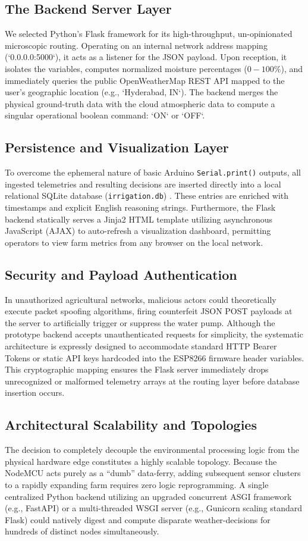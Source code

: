 \documentclass[conference]{IEEEtran}
\begin{document}
\subsection{The Backend Server Layer}
We selected Python's Flask framework for its high-throughput, un-opinionated microscopic routing. Operating on an internal network address mapping (`0.0.0.0:5000`), it acts as a listener for the JSON payload. Upon reception, it isolates the variables, computes normalized moisture percentages ($0-100\%$), and immediately queries the public OpenWeatherMap REST API \cite{b9} mapped to the user's geographic location (e.g., `Hyderabad, IN`). The backend merges the physical ground-truth data with the cloud atmospheric data to compute a singular operational boolean command: `ON` or `OFF`. 

\subsection{Persistence and Visualization Layer}
To overcome the ephemeral nature of basic Arduino \texttt{Serial.print()} outputs, all ingested telemetries and resulting decisions are inserted directly into a local relational SQLite database (\texttt{irrigation.db}) \cite{b10}. These entries are enriched with timestamps and explicit English reasoning strings. Furthermore, the Flask backend statically serves a Jinja2 HTML template utilizing asynchronous JavaScript (AJAX) to auto-refresh a visualization dashboard, permitting operators to view farm metrics from any browser on the local network. 

\subsection{Security and Payload Authentication}
In unauthorized agricultural networks, malicious actors could theoretically execute packet spoofing algorithms, firing counterfeit JSON POST payloads at the server to artificially trigger or suppress the water pump. Although the prototype backend accepts unauthenticated requests for simplicity, the systematic architecture is expressly designed to accommodate standard HTTP Bearer Tokens or static API keys hardcoded into the ESP8266 firmware header variables. This cryptographic mapping ensures the Flask server immediately drops unrecognized or malformed telemetry arrays at the routing layer before database insertion occurs.

\subsection{Architectural Scalability and Topologies}
The decision to completely decouple the environmental processing logic from the physical hardware edge constitutes a highly scalable topology. Because the NodeMCU acts purely as a ``dumb'' data-ferry, adding subsequent sensor clusters to a rapidly expanding farm requires zero logic reprogramming. A single centralized Python backend utilizing an upgraded concurrent ASGI framework (e.g., FastAPI) or a multi-threaded WSGI server (e.g., Gunicorn scaling standard Flask) could natively digest and compute disparate weather-decisions for hundreds of distinct nodes simultaneously.
\end{document}
